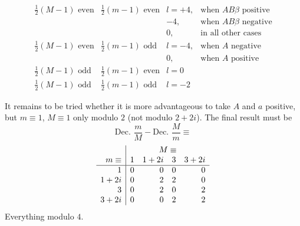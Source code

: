 \begingroup\small\setlength{\arraycolsep}{3pt}
\[
\begin{array}{ll|ll}
\frac12(M-1)\text{ even}&\frac12(m-1)\text{ even}&l=+4,&\text{when }AB\beta\text{ positive}\\
&&-4,&\text{when }AB\beta\text{ negative}\\
&&0,&\text{in all other cases}\\[3pt]
\frac12(M-1)\text{ even}&\frac12(m-1)\text{ odd}&l=-4,&\text{when }A\text{ negative}\\
&&0,&\text{when }A\text{ positive}\\[3pt]
\frac12(M-1)\text{ odd}&\frac12(m-1)\text{ even}&l=0&\\[3pt]
\frac12(M-1)\text{ odd}&\frac12(m-1)\text{ odd}&l=-2&
\end{array}
\]
\endgroup

It remains to be tried whether it is more advantageous to take $A$ and $a$ positive, but $m\equiv1$, $M\equiv1$ only modulo $2$ (not modulo $2+2i$). The final result must be
\[
\text{Dec. }\frac mM-\text{Dec. }\frac Mm\equiv
\]
\[
\begin{array}{r|rrrr}
&\multicolumn{4}{c}{M\equiv}\\
m\equiv&1&1+2i&3&3+2i\\\hline
1&0&0&0&0\\
1+2i&0&2&2&0\\
3&0&2&0&2\\
3+2i&0&0&2&2
\end{array}
\]
Everything modulo $4$.
